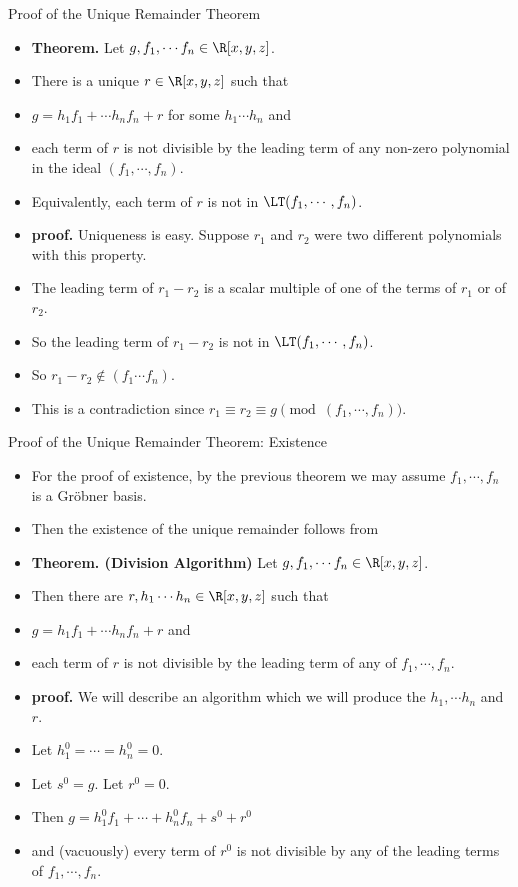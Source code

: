 \documentclass[handout]{beamer}
\begin{document}
\begin{frame}{Proof of the Unique Remainder Theorem}

\begin{itemize}
  \item \textbf{Theorem.} Let $g, f_1,\cdots f_n \in \R[x,y,z]$.
  \item There is a unique $r\in\R[x,y,z]$ such that
  \item $g = h_1 f_1 + \cdots h_n f_n + r$ for some $h_1\cdots h_n$ and
  \item each term of $r$ is not divisible by the leading term of any non-zero polynomial in the ideal $(f_1,\cdots,f_n)$.
  \item Equivalently, each term of $r$ is not in $\LT(f_1,\cdots,f_n)$.
  \item \textbf{proof.} Uniqueness is easy. Suppose $r_1$ and $r_2$ were two different polynomials with this property.
  \item The leading term of $r_1 - r_2$ is a scalar multiple of one of the terms of $r_1$ or of $r_2$.
  \item So the leading term of $r_1 - r_2$ is not in $\LT(f_1,\cdots,f_n)$.
  \item So $r_1 - r_2 \notin (f_1\cdots f_n)$.
  \item This is a contradiction since $r_1 \equiv r_2 \equiv g \pmod {(f_1,\cdots,f_n)}$.
\end{itemize}

\end{frame}

\begin{frame}{Proof of the Unique Remainder Theorem: Existence}

\begin{itemize}
  \item For the proof of existence, by the previous theorem we may assume $f_1,\cdots, f_n$ is a Gr\"{o}bner basis.
  \item Then the existence of the unique remainder follows from
  \item \textbf{Theorem. (Division Algorithm)} Let $g, f_1,\cdots f_n \in \R[x,y,z]$.
  \item Then there are $r,h_1\cdots h_n\in\R[x,y,z]$ such that
  \item $g = h_1 f_1 + \cdots h_n f_n + r$ and
  \item each term of $r$ is not divisible by the leading term of any of $f_1,\cdots,f_n$.
  \item \textbf{proof.} We will describe an algorithm which we will produce the $h_1,\cdots h_n$ and $r$.
  \item Let $h_1^0 = \cdots = h_n^0 = 0$.
  \item Let $s^0 = g$. Let $r^0 = 0$.
  \item Then $g = h_1^0 f_1 + \cdots + h_n^0 f_n + s^0 + r^0$
  \item and (vacuously) every term of $r^0$ is not divisible by any of the leading terms of $f_1,\cdots, f_n$.
\end{itemize}

\end{frame}
\end{document}
